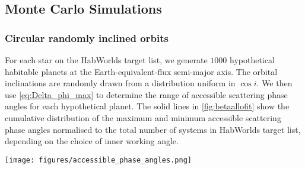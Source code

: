\documentclass[
    usenatbib,
]{mnras}
\newcommand{\todo}[1]{\textcolor{red}{[#1]}}
\newcommand{\IWA}{\ensuremath{\mathrm{IWA}}}
\newcommand{\hwo}{HabWorlds}
\begin{document}




\subsection{Monte Carlo Simulations}

\subsubsection{Circular randomly inclined orbits}
\label{sec:circular}

For each star on the \hwo{} target list, we generate $1000$  hypothetical habitable planets at the Earth-equivalent-flux semi-major axis. 
%
The orbital inclinations are randomly drawn from a distribution uniform in $\cos i$. 
%
We then use \cref{eq:Delta_phi_max} to determine the range of accessible scattering phase angles for each hypothetical planet.
%
The solid lines in \cref{fig:betaallofit} show the cumulative distribution of the maximum and minimum accessible scattering phase angles normalised to the total number of systems in \hwo{} target list, depending on the choice of inner working angle.  


\begin{figure*}%
    \centering
    \texttt{[image: figures/accessible\_phase\_angles.png]}  
    \caption{
        \todo{shouldn't lambda/D for 600nm give 21, 41, 62, 83 mas?} 
        Cumulative distributions of the most extreme scattering phase angle accessible for different \IWA{} where the solid lines are for randomly inclined circular orbits and the dashed lines are for randomly orientated elliptical orbits.
        The top x axis indicates the minimum scattering phase angle and the bottom x axis indicates the maximum.
        These are symmetric about quadrature (90 degrees).
        The y axis indicates the number of systems divided by the number of Monte Carlo samples and is thus normalised to the number of systems in the target list.
        The secondary y axis indicates the number of systems assuming only 24 percent of them contain an Earth-like exoplanet in the habitable zone.
    }
    \label{fig:betaallofit}
\end{figure*}
\end{document}
